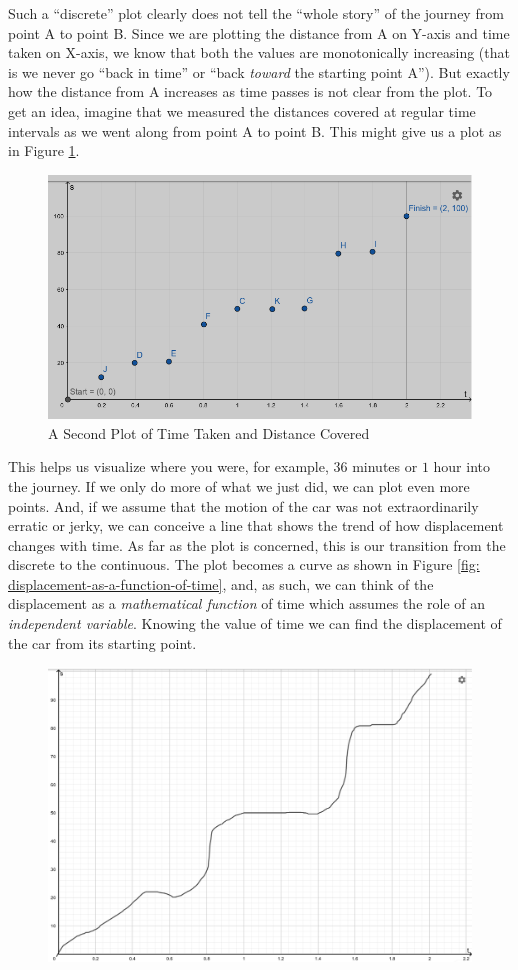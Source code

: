 \documentclass[12pt,a4paper]{book}
\begin{document}
\begin{enumerate}
\begin{enumerate}
                Such a ``discrete'' plot clearly does not tell the ``whole story'' of the journey from point A to point B. Since we are plotting the distance from A on Y-axis and time taken on X-axis, we know that both the values are monotonically increasing (that is we never go ``back in time'' or ``back \emph{toward} the starting point A''). But exactly how the distance from A increases as time passes is not clear from the plot. To get an idea, imagine that we measured the distances covered at regular time intervals as we went along from point A to point B. This might give us a plot as in Figure \ref{fig: a-second-s-t-plot}.
                        \begin{figure}[h!]
                            \centering
                            \includegraphics[width=0.5\linewidth]{a-second-s-t-plot.png}
                            \caption{A Second Plot of Time Taken and Distance Covered}
                            \label{fig: a-second-s-t-plot}
                        \end{figure}
                This helps us visualize where you were, for example, $36$ minutes or $1$ hour into the journey. If we only do more of what we just did, we can plot even more points. And, if we assume that the motion of the car was not extraordinarily erratic or jerky, we can conceive a line that shows the trend of how displacement changes with time. As far as the plot is concerned, this is our transition from the discrete to the continuous. The plot becomes a curve as shown in Figure \ref{fig: displacement-as-a-function-of-time}, and, as such, we can think of the displacement as a \emph{mathematical function} of time which assumes the role of an \emph{independent variable}. Knowing the value of time we can find the displacement of the car from its starting point.
                        \begin{figure}[h!]
                            \centering
                            \includegraphics[width=0.5\linewidth]{displacement-as-a-function-of-time.png}

\end{figure}
\end{enumerate}
\end{enumerate}
\end{document}
